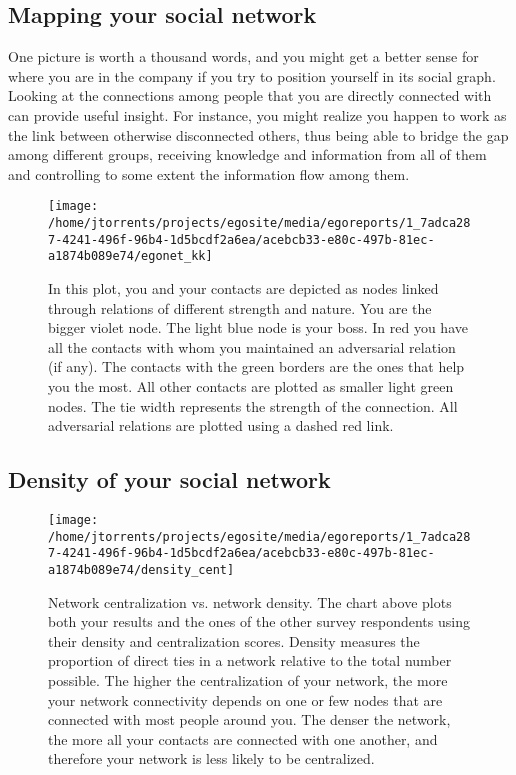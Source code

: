 \documentclass[a4paper,12pt]{article}
\begin{document}
\subsection{Mapping your social network}


One picture is worth a thousand words, and you might get a better sense for where you are in the company if you try to position yourself in its social graph. Looking at the connections among people that you are directly connected with can provide useful insight. For instance, you might realize you happen to work as the link between otherwise disconnected others, thus being able to bridge the gap among different groups, receiving knowledge and information from all of them and controlling to some extent the information flow among them.


\begin{figure}[H]
\centering
\texttt{[image: /home/jtorrents/projects/egosite/media/egoreports/1\_7adca287-4241-496f-96b4-1d5bcdf2a6ea/acebcb33-e80c-497b-81ec-a1874b089e74/egonet\_kk]}
\caption{In this plot, you and your contacts are depicted as nodes linked through relations of different strength and nature. You are the bigger violet node. The light blue node is your boss. In red you have all the contacts with whom you maintained an adversarial relation (if any). The contacts with the green borders are the ones that help you the most. All other contacts are plotted as smaller light green nodes. The tie width represents the strength of the connection. All adversarial relations are plotted using a dashed red link.}
\end{figure}


\subsection{Density of your social network}


\begin{figure}[H]
\centering
\texttt{[image: /home/jtorrents/projects/egosite/media/egoreports/1\_7adca287-4241-496f-96b4-1d5bcdf2a6ea/acebcb33-e80c-497b-81ec-a1874b089e74/density\_cent]}
\caption{Network centralization vs. network density. The chart above plots both your results and the ones of the other survey respondents using their density and centralization scores. Density measures the proportion of direct ties in a network relative to the total number possible. The higher the centralization of your network, the more your network connectivity depends on one or few nodes that are connected with most people around you. The denser the network, the more all your contacts are connected with one another, and therefore your network is less likely to be centralized.}
\end{figure}
\end{document}
